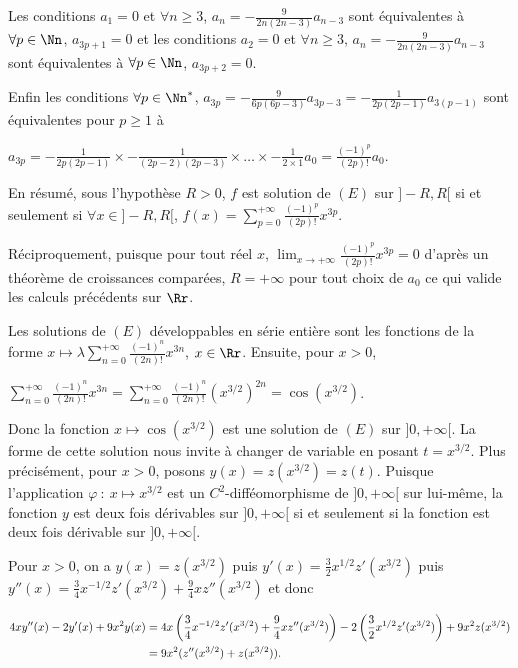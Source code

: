 {\begin{enumerate}
{Les conditions $a_1=0$ et $\forall n\geqslant3$, $a_n=- \frac{9}{2n(2n-3)}a_{n-3}$ sont équivalentes à $\forall p\in\Nn$, $a_{3p+1}=0$ et les conditions $a_2=0$ et $\forall n\geqslant3$, $a_n=- \frac{9}{2n(2n-3)}a_{n-3}$ sont équivalentes à $\forall p\in\Nn$, $a_{3p+2}=0$.

Enfin les conditions $\forall p\in\Nn^*$, $a_{3p}=- \frac{9}{6p(6p-3)}a_{3p-3}=- \frac{1}{2p(2p-1)}a_{3(p-1)}$ sont équivalentes pour $p\geqslant1$ à

\begin{center}
$a_{3p}=- \frac{1}{2p(2p-1)}\times- \frac{1}{(2p-2)(2p-3)}\times\ldots\times- \frac{1}{2\times1}a_0= \frac{(-1)^p}{(2p)!}a_0$.
\end{center}

En résumé, sous l'hypothèse $R>0$, $f$ est solution de $(E)$ sur $]-R,R[$ si et seulement si $\forall x\in]-R,R[$, $f(x)=\sum_{p=0}^{+\infty} \frac{(-1)^p}{(2p)!}x^{3p}$.

Réciproquement, puisque pour tout réel $x$, $\lim_{x \rightarrow +\infty} \frac{(-1)^p}{(2p)!}x^{3p}=0$ d'après un théorème de croissances comparées, $R=+\infty$ pour tout choix de $a_0$ ce qui valide les calculs précédents sur $\Rr$.

Les solutions de $(E)$ développables en série entière sont les fonctions de la forme $x\mapsto\lambda\sum_{n=0}^{+\infty} \frac{(-1)^n}{(2n)!}x^{3n}$, $x\in\Rr$. Ensuite, pour $x>0$,

\begin{center}
$\sum_{n=0}^{+\infty} \frac{(-1)^n}{(2n)!}x^{3n}=\sum_{n=0}^{+\infty} \frac{(-1)^n}{(2n)!}(x^{3/2})^{2n}=\cos\left(x^{3/2}\right)$.
\end{center}

Donc la fonction $x\mapsto\cos\left(x^{3/2}\right)$ est une solution de $(E)$ sur $]0,+\infty[$. La forme de cette solution nous invite à changer de variable en posant $t=x^{3/2}$. Plus précisément, pour $x>0$, posons $y(x)=z(x^{3/2})=z(t)$. Puisque l'application $\varphi~:~x\mapsto x^{3/2}$ est un $C^2$-difféomorphisme de $]0,+\infty[$ sur lui-même, la fonction $y$ est deux fois dérivables sur $]0,+\infty[$ si et seulement si la fonction est deux fois dérivable sur $]0,+\infty[$.

Pour $x>0$, on a $y(x)=z(x^{3/2})$ puis $y'(x)= \frac{3}{2}x^{1/2}z'(x^{3/2})$ puis $y''(x)= \frac{3}{4}x^{-1/2}z'(x^{3/2})+ \frac{9}{4}xz''(x^{3/2})$ et donc

\begin{align*}\ensuremath
4xy''(x)- 2y'(x)+ 9x^2y(x)&=4x\left( \frac{3}{4}x^{-1/2}z'(x^{3/2})+ \frac{9}{4}xz''(x^{3/2})\right)-2\left( \frac{3}{2}x^{1/2}z'(x^{3/2})\right)+9x^2z(x^{3/2})\\
 &=9x^2(z''(x^{3/2})+z(x^{3/2})).
\end{align*}

}
\end{enumerate}}
